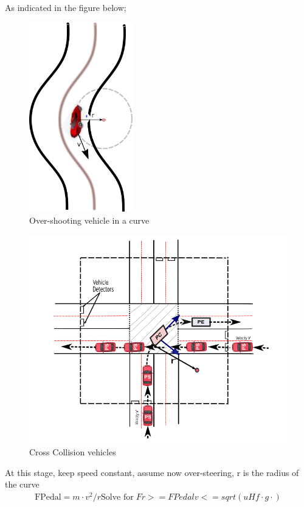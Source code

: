 \documentclass{book}
\begin{document}
As indicated in the figure below;
\begin{figure}[tbp]
  \centering
  \includegraphics[width=0.4\textwidth]{text11376}
  \caption{Over-shooting vehicle in a curve}
  \label{fig:overshootingcar}
\end{figure}

\begin{figure}[htbp]
  \centering
  \includegraphics[width=1.0\textwidth]{CollisionVehicle.PNG}
  \caption{Cross Collision vehicles}
\end{figure}

At this stage, keep speed constant, assume now over-steering, r is the radius of the curve
\begin{eqnarray}
\mbox{FPedal} = m \cdot v^2/r
\mbox{Solve for} \; Fr >= FPedal  %
 v <= sqrt (uHf \cdot g \cdot)
\end{eqnarray}
\end{document}

